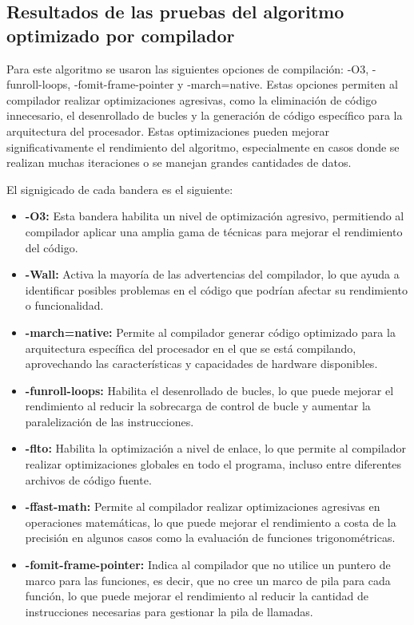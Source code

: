 
\subsection{Resultados de las pruebas del algoritmo optimizado por compilador}
\label{sec:Resultados_compilador}

Para este algoritmo se usaron las siguientes opciones de compilación: -O3, -funroll-loops, -fomit-frame-pointer y -march=native. Estas opciones permiten al compilador realizar optimizaciones agresivas, como la eliminación de código innecesario, el desenrollado de bucles y la generación de código específico para la arquitectura del procesador. Estas optimizaciones pueden mejorar significativamente el rendimiento del algoritmo, especialmente en casos donde se realizan muchas iteraciones o se manejan grandes cantidades de datos. 

El signigicado de cada bandera es el siguiente:
\begin{itemize}
   \item \textbf{-O3:} Esta bandera habilita un nivel de optimización agresivo, permitiendo al compilador aplicar una amplia gama de técnicas para mejorar el rendimiento del código.
   \item \textbf{-Wall:} Activa la mayoría de las advertencias del compilador, lo que ayuda a identificar posibles problemas en el código que podrían afectar su rendimiento o funcionalidad.
   \item \textbf{-march=native:} Permite al compilador generar código optimizado para la arquitectura específica del procesador en el que se está compilando, aprovechando las características y capacidades de hardware disponibles.
   \item \textbf{-funroll-loops:} Habilita el desenrollado de bucles, lo que puede mejorar el rendimiento al reducir la sobrecarga de control de bucle y aumentar la paralelización de las instrucciones.
   \item \textbf{-flto:} Habilita la optimización a nivel de enlace, lo que permite al compilador realizar optimizaciones globales en todo el programa, incluso entre diferentes archivos de código fuente.
   \item \textbf{-ffast-math:} Permite al compilador realizar optimizaciones agresivas en operaciones matemáticas, lo que puede mejorar el rendimiento a costa de la precisión en algunos casos como la evaluación de funciones trigonométricas.
   \item \textbf{-fomit-frame-pointer:} Indica al compilador que no utilice un puntero de marco para las funciones, es decir, que no cree un marco de pila para cada función, lo que puede mejorar el rendimiento al reducir la cantidad de instrucciones necesarias para gestionar la pila de llamadas.
\end{itemize}


